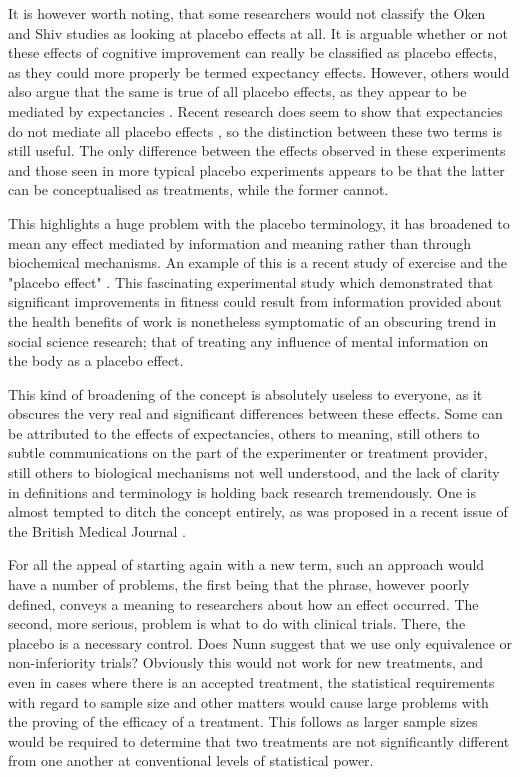 It is however worth noting, that some researchers would not classify the Oken and Shiv studies as looking at placebo effects at all. It is arguable whether or not these effects of cognitive improvement can really be classified as placebo effects, as they could more properly be termed expectancy effects. However, others would also argue that the same is true of all placebo effects, as they appear to be mediated by expectancies \cite{Kirsch1985,Kirsch1997,Montgomery1997}. Recent research does seem to show that expectancies do not mediate all placebo effects \cite{Benedetti2003a}, so the distinction between these two terms is still useful.  The only difference between the effects observed in these experiments and those seen in more typical placebo experiments appears to be that the latter can be conceptualised as treatments, while the former cannot. 

This highlights a huge problem with the placebo terminology, it has broadened to mean any effect mediated by information and meaning rather than through biochemical mechanisms. An example of this is a recent study of exercise and the "placebo effect" \cite{Crum2007}. This fascinating experimental study which demonstrated that significant improvements in fitness could result from information provided about the health benefits of work is nonetheless symptomatic of an obscuring trend in social science research; that of treating any influence of mental information on the body as a placebo effect. 

This kind of broadening of the concept is absolutely useless to everyone, as it obscures the very real and significant differences between these effects. Some can be attributed to the effects of expectancies, others to meaning, still others to subtle communications on the part of the experimenter or treatment provider, still others to biological mechanisms not well understood, and the lack of clarity in definitions and terminology is holding back research tremendously. One is almost tempted to ditch the concept entirely, as was proposed in a recent issue of the British Medical Journal \cite{nunn2009s}. 

For all the appeal of starting again with a new term, such an approach would have a number of problems, the first being that the phrase, however poorly defined, conveys a meaning to researchers about how an effect occurred. The second, more serious, problem is what to do with clinical trials. There, the placebo is a necessary control. Does Nunn suggest that we use only equivalence or non-inferiority trials? Obviously this would not work for new treatments, and even in cases where there is an accepted treatment, the statistical requirements with regard to sample size and other matters would cause large problems with the proving of the efficacy of a treatment. This follows as larger sample sizes would be required to determine that two treatments are not significantly different from one another at conventional levels of statistical power. %


